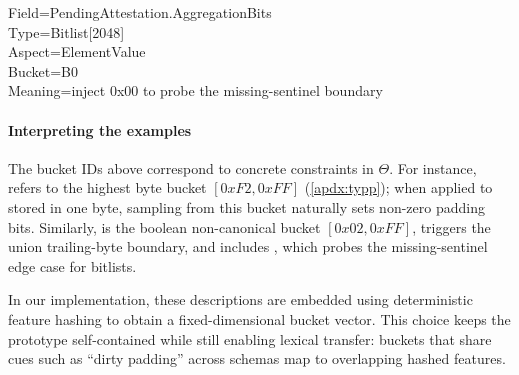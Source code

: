 \begin{mdframed}[
    backgroundcolor=gray!10,
    linecolor=white,
    skipabove=0.2em
    ]
\noindent\ttfamily\small
Field=PendingAttestation.\allowbreak AggregationBits \\
Type=Bitlist[2048] \\
Aspect=ElementValue \\
Bucket=B0 \\
Meaning=inject 0x00 to probe the missing-sentinel boundary
\end{mdframed}

\paragraph{Interpreting the examples}
The bucket IDs above correspond to concrete constraints in $\Theta$.
For instance,  refers to the highest byte bucket $[0xF2,0xFF]$ (\autoref{apdx:typp}); when applied to  stored in one byte, sampling from this bucket naturally sets non-zero padding bits.
Similarly,  is the boolean non-canonical bucket $[0x02,0xFF]$,  triggers the union trailing-byte boundary, and  includes , which probes the missing-sentinel edge case for bitlists.

In our implementation, these descriptions are embedded using deterministic feature hashing to obtain a fixed-dimensional bucket vector.
This choice keeps the prototype self-contained while still enabling lexical transfer: buckets that share cues such as ``dirty padding'' across schemas map to overlapping hashed features.
